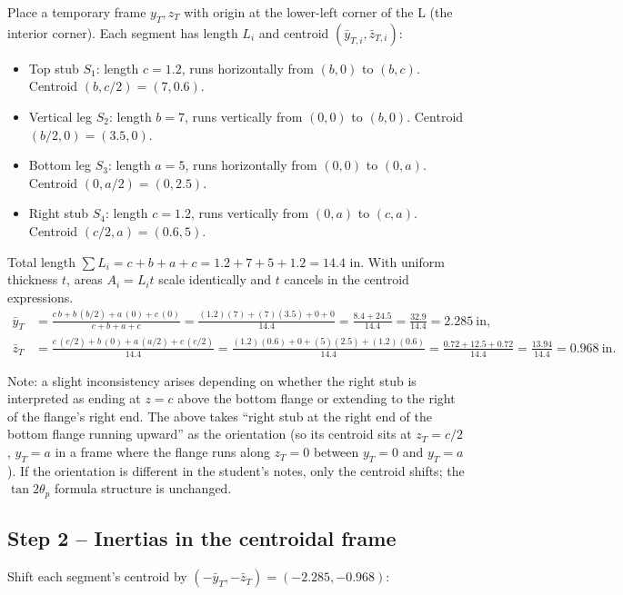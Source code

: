 \documentclass[11pt]{article}
\begin{document}
Place a temporary frame $y_T, z_T$ with origin at the lower-left corner of the L (the interior corner). Each segment has length $L_i$ and centroid $(\bar y_{T,i}, \bar z_{T,i})$:
\begin{itemize}[leftmargin=2em, itemsep=0pt]
  \item Top stub $S_1$: length $c = 1.2$, runs horizontally from $(b, 0)$ to $(b, c)$. Centroid $(b, c/2) = (7, 0.6)$.
  \item Vertical leg $S_2$: length $b = 7$, runs vertically from $(0, 0)$ to $(b, 0)$. Centroid $(b/2, 0) = (3.5, 0)$.
  \item Bottom leg $S_3$: length $a = 5$, runs horizontally from $(0, 0)$ to $(0, a)$. Centroid $(0, a/2) = (0, 2.5)$.
  \item Right stub $S_4$: length $c = 1.2$, runs vertically from $(0, a)$ to $(c, a)$. Centroid $(c/2, a) = (0.6, 5)$.
\end{itemize}
Total length $\sum L_i = c + b + a + c = 1.2 + 7 + 5 + 1.2 = 14.4$ in. With uniform thickness $t$, areas $A_i = L_i t$ scale identically and $t$ cancels in the centroid expressions.
\begin{align*}
\bar y_T &= \frac{c\,b + b\,(b/2) + a\,(0) + c\,(0)}{c + b + a + c} = \frac{(1.2)(7) + (7)(3.5) + 0 + 0}{14.4} = \frac{8.4 + 24.5}{14.4} = \frac{32.9}{14.4} = 2.285\ \text{in},\\
\bar z_T &= \frac{c\,(c/2) + b\,(0) + a\,(a/2) + c\,(c/2)}{14.4} = \frac{(1.2)(0.6) + 0 + (5)(2.5) + (1.2)(0.6)}{14.4} = \frac{0.72 + 12.5 + 0.72}{14.4} = \frac{13.94}{14.4} = 0.968\ \text{in}.
\end{align*}

Note: a slight inconsistency arises depending on whether the right stub is interpreted as ending at $z = c$ above the bottom flange or extending to the right of the flange's right end. The above takes ``right stub at the right end of the bottom flange running upward'' as the orientation (so its centroid sits at $z_T = c/2$, $y_T = a$ in a frame where the flange runs along $z_T = 0$ between $y_T = 0$ and $y_T = a$). If the orientation is different in the student's notes, only the centroid shifts; the $\tan 2\theta_p$ formula structure is unchanged.

\subsection*{Step 2 -- Inertias in the centroidal frame}

Shift each segment's centroid by $(-\bar y_T, -\bar z_T) = (-2.285, -0.968)$:
\end{document}
